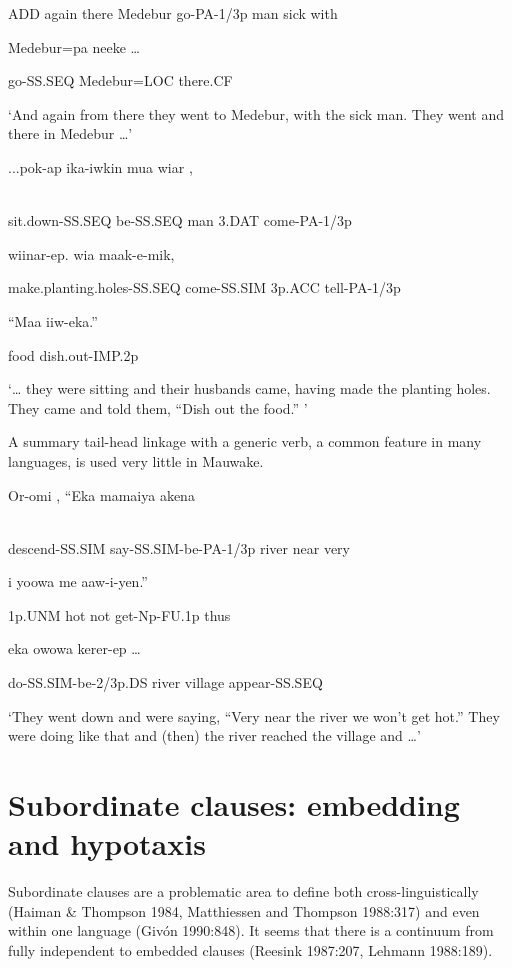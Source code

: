ADD  again  there  Medebur  go-PA-1/3p  man  sick  with

  Medebur=pa  neeke  {\dots}

go-SS.SEQ  Medebur=LOC  there.CF

`And again from there they went to Medebur, with the sick man. They went and there in Medebur {\dots}'

\ea%
\label{ex:x1519}
\gll ...pok-ap  ika-iwkin  mua  wiar  ,  \\
      \\
\glt
\z

sit.down-SS.SEQ  be-SS.SEQ  man  3.DAT  come-PA-1/3p

wiinar-ep.    wia  maak-e-mik,

make.planting.holes-SS.SEQ  come-SS.SIM  3p.ACC  tell-PA-1/3p

``Maa  iiw-eka.''

food  dish.out-IMP.2p

`{\dots} they were sitting and their husbands came, having made the planting holes. They came and told them, ``Dish out the food.'' '

A summary tail-head linkage with a generic verb, a common feature in many  languages, is used very little in Mauwake. 

\ea%
\label{ex:x1520}
\gll Or-omi  ,  ``Eka  mamaiya  akena  \\
      \\
\glt
\z

descend-SS.SIM  say-SS.SIM-be-PA-1/3p  river  near  very

i  yoowa  me  aaw-i-yen.''  

1p.UNM  hot  not  get-Np-FU.1p  thus

  eka  owowa  kerer-ep  {\dots}

do-SS.SIM-be-2/3p.DS  river  village  appear-SS.SEQ

`They went down and were saying, ``Very near the river we won't get hot.'' They were doing like that and (then) the river reached the village and {\dots}'

\section{Subordinate clauses: embedding and hypotaxis}
\hypertarget{RefHeading23281935131865}{}
Subordinate clauses are a problematic area to define both cross-linguistically (Haiman \& Thompson 1984, Matthiessen and Thompson 1988:317) and even within one language (Giv\'on 1990:848). It seems that there is a continuum from fully independent to embedded clauses (Reesink 1987:207, Lehmann 1988:189). 

